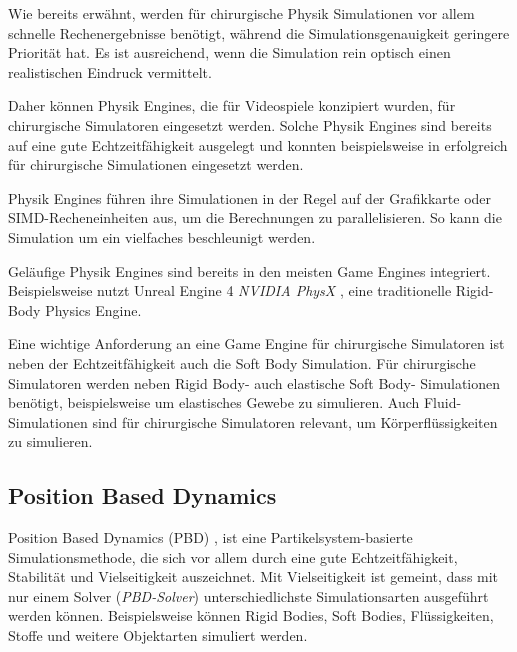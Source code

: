 Wie bereits erwähnt, werden für chirurgische Physik Simulationen vor allem schnelle Rechenergebnisse benötigt, während die Simulationsgenauigkeit geringere Priorität hat. Es ist ausreichend, wenn die Simulation rein optisch einen realistischen Eindruck vermittelt.


Daher können Physik Engines, die für Videospiele konzipiert wurden, für chirurgische Simulatoren eingesetzt werden. Solche Physik Engines sind bereits auf eine gute Echtzeitfähigkeit ausgelegt und konnten beispielsweise in \cite{SimUpdate} erfolgreich für chirurgische Simulationen eingesetzt werden. 

Physik Engines führen ihre Simulationen in der Regel auf der Grafikkarte oder SIMD-Recheneinheiten aus, um die Berechnungen zu parallelisieren. So kann die Simulation um ein vielfaches beschleunigt werden.

Geläufige Physik Engines sind bereits in den meisten Game Engines integriert. Beispielsweise nutzt Unreal Engine 4 \textit{NVIDIA PhysX} \cite{ue4physics}, eine traditionelle Rigid-Body Physics Engine.

Eine wichtige Anforderung an eine Game Engine für chirurgische Simulatoren ist neben der Echtzeitfähigkeit auch die Soft Body Simulation. Für chirurgische Simulatoren werden neben Rigid Body- auch elastische Soft Body- Simulationen benötigt, beispielsweise um elastisches Gewebe zu simulieren. Auch Fluid-Simulationen sind für chirurgische Simulatoren relevant, um Körperflüssigkeiten zu simulieren.

\subsection{Position Based Dynamics}
\label{section_PBD}

Position Based Dynamics (PBD) \cite{PBD}, ist eine Partikelsystem-basierte Simulationsmethode, die sich vor allem durch eine gute Echtzeitfähigkeit, Stabilität und Vielseitigkeit auszeichnet. Mit Vielseitigkeit ist gemeint, dass mit nur einem Solver (\textit{PBD-Solver}) unterschiedlichste Simulationsarten ausgeführt werden können. Beispielsweise können Rigid Bodies, Soft Bodies, Flüssigkeiten, Stoffe und weitere Objektarten simuliert werden. 

